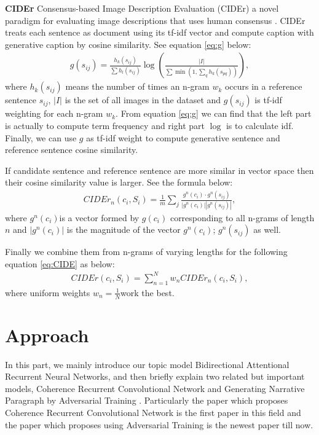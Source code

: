 \documentclass[11pt]{article}
\begin{document}
{\bf CIDEr} Consensus-based Image Description Evaluation (CIDEr) a novel paradigm for evaluating image descriptions that uses human consensus \cite{vedantam2015cider}. CIDEr treats each sentence as document using its tf-idf vector and compute caption with generative caption by cosine similarity. See equation \ref{eq:g} below:
\begin{equation}
\begin{aligned}
g(s_{ij}) = \frac{h_{k}(s_{ij})}{\sum h_{l} (s_{ij})} \log\left(\frac{|I|}{\sum\min(1,\sum_{q}h_{k}(s_{pq}))}\right),  
\end{aligned}
\label{eq:g}
\end{equation}
where $h_{k}(s_{ij})$ means the number of
times an n-gram $w_{k}$ occurs in a reference sentence $s_{ij}$, $|I|$ is  the set of all images in the dataset and $g(s_{ij})$  is tf-idf weighting for each n-gram $w_{k}$. From equation \ref{eq:g} we can find that the left part is actually to compute term frequency and right part $\log$ is to calculate idf. Finally, we can use $g$ as tf-idf weight to compute generative sentence and reference sentence cosine similarity.

If candidate sentence and reference sentence are more similar in vector space then their cosine similarity value is larger. See the formula below:
\begin{equation}
\begin{aligned}
CIDEr_{n}(c_{i},S_{i}) = \frac{1}{m} \sum_{j} \frac{g^{n}(c_{i}) \cdot g^{n}(s_{ij}) }{ |g^{n}(c_{i})| |g^{n}(s_{ij})|},
\end{aligned}
\label{eq:CIDEr}
\end{equation}
where $g^{n}(c_i)$is a vector formed by $g(c_i)$ corresponding to
all n-grams of length $n$ and $|g^{n}(c_i)|$ is the magnitude of the vector $g^n(c_i)$; $g^n(s_{ij})$ as well.

Finally we combine them from n-grams of varying lengths for the following equation \ref{eq:CIDE} as below:
\begin{equation}
\begin{aligned}
CIDEr(c_{i},S_{i}) = \sum_{n=1}^{N} w_n CIDEr_{n}(c_i,S_i),
\end{aligned}
\label{eq:CIDE}
\end{equation}
where uniform weights $w_n = \frac{1}{N} $work the best.


		
		
		
\section{Approach}
In this part, we mainly introduce our topic model Bidirectional Attentional Recurrent Neural Networks, and then briefly explain two related but important models, Coherence Recurrent Convolutional Network \cite{NIPS2015_5776} and Generating Narrative Paragraph by Adversarial Training \cite{show-reward-tell-automatic-generation-narrative-paragraph-photo-stream-adversarial-training}. Particularly  the paper which proposes Coherence Recurrent Convolutional Network is the first paper in this field and the paper which proposes using Adversarial Training is the newest paper till now.
\end{document}
